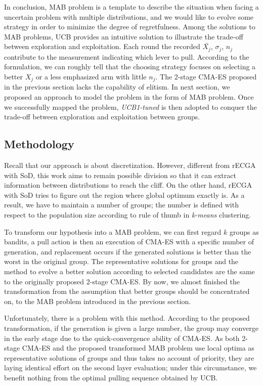 In conclusion, MAB problem is a template to describe the situation when
facing a uncertain problem with multiple distributions, and we would
like to evolve some strategy in order to minimize the degree of
regretfulness.
Among the solutions to MAB problems, UCB provides an intuitive solution
to illustrate the trade-off between exploration and exploitation.
Each round the recorded $\bar{X_j}$, $\sigma_j$, $n_j$ contribute to the
measurement indicating which lever to pull.
According to the formulation, we can roughly tell that the choosing
strategy focuses on selecting a better $X_j$ or a less emphasized arm
with little $n_j$.
The 2-stage CMA-ES proposed in the previous section lacks the capability
of elitism.
In next section, we proposed an approach to model the problem in the
form of MAB problem.
Once we successfully mapped the problem, \emph{UCB1-tuned} is then
adopted to conquer the trade-off between exploration and exploitation
between groups.

\subsection{Methodology}

Recall that our approach is about discretization.
However, different from rECGA with SoD, this work aims to remain
possible division so that it can extract information between distributions
to reach the cliff.
On the other hand, rECGA with SoD tries to figure out the region where
global optimum exactly is.
As a result, we have to maintain a number of groups; the number is
defined with respect to the population size according to rule of thumb
in \emph{k-means} clustering.

To transform our hypothesis into a MAB problem, we can first regard $k$
groups as bandits, a pull action is then an execution of CMA-ES with a
specific number of generation, and replacement occurs if the generated
solutions is better than the worst in the original group.
The representative solutions for groups and the method to evolve a
better solution according to selected candidates are the same to the
originally proposed 2-stage CMA-ES.
By now, we almost finished the transformation from the assumption that
better groups should be concentrated on, to the MAB problem introduced
in the previous section.

Unfortunately, there is a problem with this method.
According to the proposed transformation, if the generation is given a
large number, the group may converge in the early stage due to the
quick-convergence ability of CMA-ES.
As both 2-stage CMA-ES and the proposed transformed MAB problem use
local optima as representative solutions of groups and thus takes no
account of priority, they are laying identical effort on the second
layer evaluation; under this circumstance, we benefit nothing from the
optimal pulling sequence obtained by UCB.

